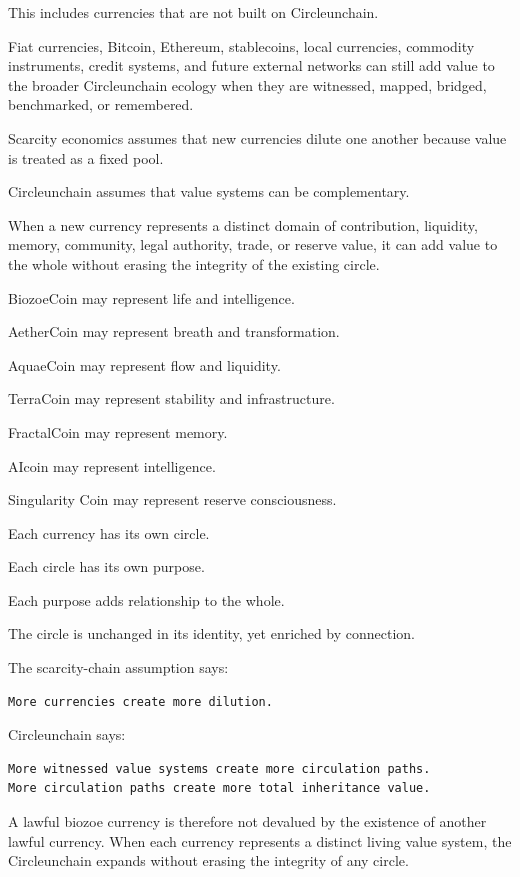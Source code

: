 ﻿\documentclass[12pt]{article}
\begin{document}
This includes currencies that are not built on Circleunchain.

Fiat currencies, Bitcoin, Ethereum, stablecoins, local currencies, commodity instruments, credit systems, and future external networks can still add value to the broader Circleunchain ecology when they are witnessed, mapped, bridged, benchmarked, or remembered.

Scarcity economics assumes that new currencies dilute one another because value is treated as a fixed pool.

Circleunchain assumes that value systems can be complementary.

When a new currency represents a distinct domain of contribution, liquidity, memory, community, legal authority, trade, or reserve value, it can add value to the whole without erasing the integrity of the existing circle.

BiozoeCoin may represent life and intelligence.

AetherCoin may represent breath and transformation.

AquaeCoin may represent flow and liquidity.

TerraCoin may represent stability and infrastructure.

FractalCoin may represent memory.

AIcoin may represent intelligence.

Singularity Coin may represent reserve consciousness.

Each currency has its own circle.

Each circle has its own purpose.

Each purpose adds relationship to the whole.

The circle is unchanged in its identity, yet enriched by connection.

The scarcity-chain assumption says:

\begin{verbatim}
More currencies create more dilution.
\end{verbatim}

Circleunchain says:

\begin{verbatim}
More witnessed value systems create more circulation paths.
More circulation paths create more total inheritance value.
\end{verbatim}

A lawful biozoe currency is therefore not devalued by the existence of another lawful currency. When each currency represents a distinct living value system, the Circleunchain expands without erasing the integrity of any circle.
\end{document}
